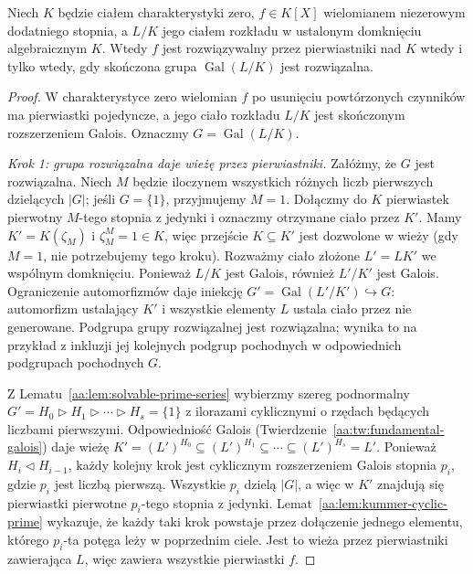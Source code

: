 \begin{twierdzenie}
\label{aa:tw:radicals-solvable-galois}
\label{aa:thm:radicals-implies-solvable}
Niech $K$ będzie ciałem charakterystyki zero,
$f\in K[X]$ wielomianem niezerowym dodatniego stopnia,
a $L/K$ jego ciałem rozkładu w ustalonym domknięciu
algebraicznym $K$. Wtedy $f$ jest rozwiązywalny
przez pierwiastniki nad $K$ wtedy i tylko wtedy,
gdy skończona grupa $\operatorname{Gal}(L/K)$ jest rozwiązalna.
\end{twierdzenie}
\begin{proof}
W charakterystyce zero wielomian $f$ po usunięciu
powtórzonych czynników ma pierwiastki pojedyncze,
a jego ciało rozkładu $L/K$ jest skończonym rozszerzeniem
Galois. Oznaczmy $G=\operatorname{Gal}(L/K)$.

\emph{Krok 1: grupa rozwiązalna daje wieżę przez pierwiastniki.}
Załóżmy, że $G$ jest rozwiązalna. Niech
$M$ będzie iloczynem wszystkich różnych liczb pierwszych
dzielących $|G|$; jeśli $G=\{1\}$, przyjmujemy $M=1$.
Dołączmy do $K$ pierwiastek pierwotny $M$-tego stopnia
z jedynki i oznaczmy otrzymane ciało przez $K'$.
Mamy $K'=K(\zeta_M)$ i $\zeta_M^M=1\in K$,
więc przejście $K\subseteq K'$ jest dozwolone w wieży
(gdy $M=1$, nie potrzebujemy tego kroku).
Rozważmy ciało złożone $L'=LK'$ we wspólnym domknięciu.
Ponieważ $L/K$ jest Galois, również $L'/K'$ jest Galois.
Ograniczenie automorfizmów daje iniekcję
$G'=\operatorname{Gal}(L'/K')\hookrightarrow G$:
automorfizm ustalający $K'$ i wszystkie elementy $L$
ustala ciało przez nie generowane. Podgrupa grupy rozwiązalnej
jest rozwiązalna; wynika to na przykład z inkluzji
jej kolejnych podgrup pochodnych w odpowiednich
podgrupach pochodnych $G$.

Z Lematu~\ref{aa:lem:solvable-prime-series} wybierzmy
szereg podnormalny
$G'=H_0\triangleright H_1\triangleright\cdots
\triangleright H_s=\{1\}$ z ilorazami cyklicznymi
o rzędach będących liczbami pierwszymi. Odpowiedniość Galois
(Twierdzenie~\ref{aa:tw:fundamental-galois}) daje wieżę
$K'=(L')^{H_0}\subseteq (L')^{H_1}\subseteq\cdots
\subseteq (L')^{H_s}=L'$.
Ponieważ $H_i\triangleleft H_{i-1}$,
każdy kolejny krok jest cyklicznym rozszerzeniem
Galois stopnia $p_i$, gdzie $p_i$ jest liczbą pierwszą. Wszystkie $p_i$
dzielą $|G|$, a więc w $K'$ znajdują się pierwiastki
pierwotne $p_i$-tego stopnia z jedynki.
Lemat~\ref{aa:lem:kummer-cyclic-prime} wykazuje,
że każdy taki krok powstaje przez dołączenie jednego
elementu, którego $p_i$-ta potęga leży w poprzednim ciele.
Jest to wieża przez pierwiastniki zawierająca $L$,
więc zawiera wszystkie pierwiastki $f$.


\end{proof}

